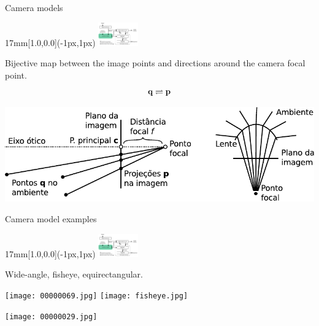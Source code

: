 \begin{frame}{Camera models}
  \begin{textblock*}{17mm}[1.0,0.0](\paperwidth-1px,1px)
    \includegraphics[width=17mm]{blocos_s2.png}
  \end{textblock*}
  Bijective map between the image points and directions around the camera focal point.
  \[{\mathbf{q}}\rightleftharpoons{\mathbf{p}}\]

  \begin{center}
    \includegraphics[height=6\baselineskip]{camera_model.pdf}   
  \end{center}
\end{frame}


\begin{frame}{Camera model examples}
  \begin{textblock*}{17mm}[1.0,0.0](\paperwidth-1px,1px)
    \includegraphics[width=17mm]{blocos_s2.png}
  \end{textblock*}
  Wide-angle, fisheye, equirectangular.
  \centerline{
    \texttt{[image: 00000069.jpg]}
    \texttt{[image: fisheye.jpg]}
  }
  \centerline{
    \texttt{[image: 00000029.jpg]}
  }
\end{frame}


